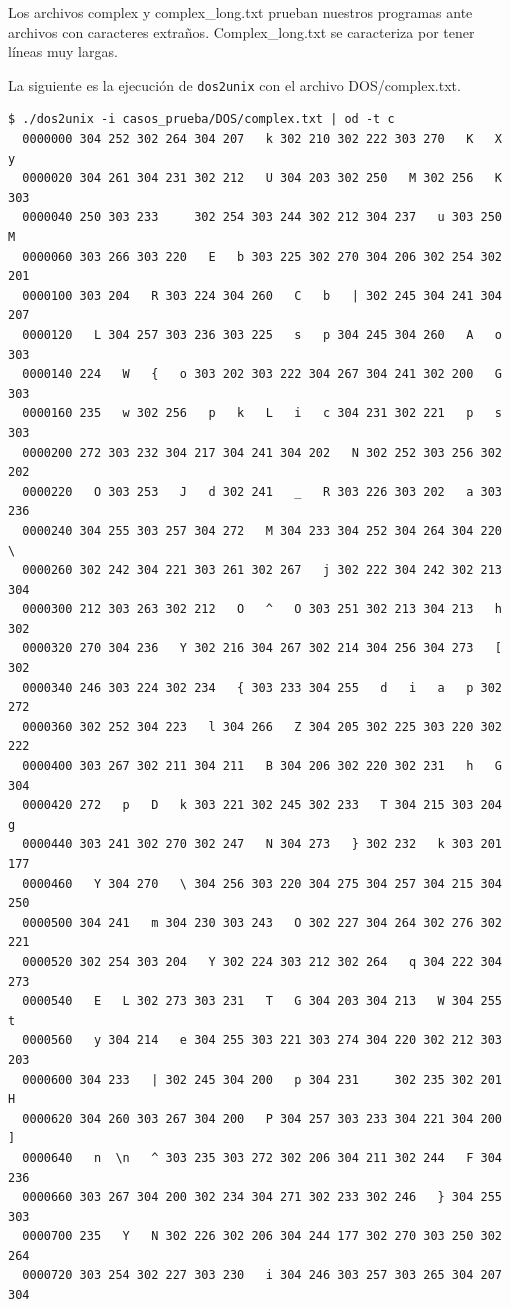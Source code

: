 \documentclass[a4paper,10pt, spanish]{article}
\begin{document}
Los archivos complex y complex\_long.txt prueban nuestros programas ante archivos con caracteres
extraños. Complex\_long.txt se caracteriza por tener líneas muy largas.

La siguiente es la ejecución de \lstinline{dos2unix} con el archivo DOS/complex.txt. 

\begin{lstlisting}
$ ./dos2unix -i casos_prueba/DOS/complex.txt | od -t c
  0000000 304 252 302 264 304 207   k 302 210 302 222 303 270   K   X   y
  0000020 304 261 304 231 302 212   U 304 203 302 250   M 302 256   K 303
  0000040 250 303 233     302 254 303 244 302 212 304 237   u 303 250   M
  0000060 303 266 303 220   E   b 303 225 302 270 304 206 302 254 302 201
  0000100 303 204   R 303 224 304 260   C   b   | 302 245 304 241 304 207
  0000120   L 304 257 303 236 303 225   s   p 304 245 304 260   A   o 303
  0000140 224   W   {   o 303 202 303 222 304 267 304 241 302 200   G 303
  0000160 235   w 302 256   p   k   L   i   c 304 231 302 221   p   s 303
  0000200 272 303 232 304 217 304 241 304 202   N 302 252 303 256 302 202
  0000220   O 303 253   J   d 302 241   _   R 303 226 303 202   a 303 236
  0000240 304 255 303 257 304 272   M 304 233 304 252 304 264 304 220   \
  0000260 302 242 304 221 303 261 302 267   j 302 222 304 242 302 213 304
  0000300 212 303 263 302 212   O   ^   O 303 251 302 213 304 213   h 302
  0000320 270 304 236   Y 302 216 304 267 302 214 304 256 304 273   [ 302
  0000340 246 303 224 302 234   { 303 233 304 255   d   i   a   p 302 272
  0000360 302 252 304 223   l 304 266   Z 304 205 302 225 303 220 302 222
  0000400 303 267 302 211 304 211   B 304 206 302 220 302 231   h   G 304
  0000420 272   p   D   k 303 221 302 245 302 233   T 304 215 303 204   g
  0000440 303 241 302 270 302 247   N 304 273   } 302 232   k 303 201 177
  0000460   Y 304 270   \ 304 256 303 220 304 275 304 257 304 215 304 250
  0000500 304 241   m 304 230 303 243   O 302 227 304 264 302 276 302 221
  0000520 302 254 303 204   Y 302 224 303 212 302 264   q 304 222 304 273
  0000540   E   L 302 273 303 231   T   G 304 203 304 213   W 304 255   t
  0000560   y 304 214   e 304 255 303 221 303 274 304 220 302 212 303 203
  0000600 304 233   | 302 245 304 200   p 304 231     302 235 302 201   H
  0000620 304 260 303 267 304 200   P 304 257 303 233 304 221 304 200   ]
  0000640   n  \n   ^ 303 235 303 272 302 206 304 211 302 244   F 304 236
  0000660 303 267 304 200 302 234 304 271 302 233 302 246   } 304 255 303
  0000700 235   Y   N 302 226 302 206 304 244 177 302 270 303 250 302 264
  0000720 303 254 302 227 303 230   i 304 246 303 257 303 265 304 207 304

\end{lstlisting}
\end{document}
